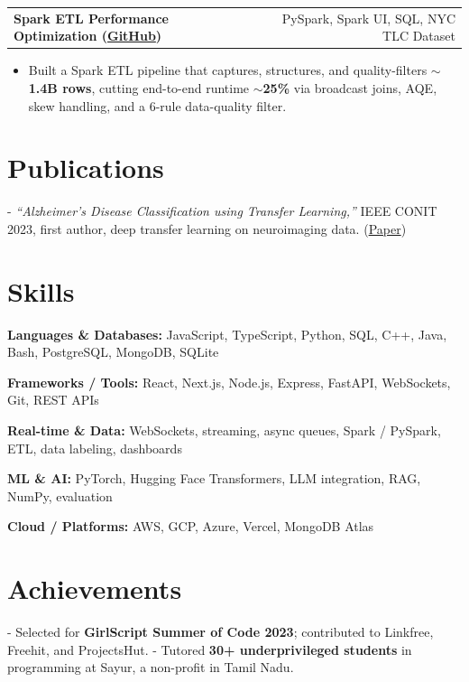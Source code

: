 \documentclass[letterpaper,11pt]{article}
\makeatletter
\newcommand{\projItem}[2]{%
  \vspace{6pt}
  \begin{tabular*}{\textwidth}{@{}l@{\extracolsep{\fill}}r@{}}
    \textbf{#1} & #2 \\
  \end{tabular*}\par\vspace{-2pt}
}
\newcommand{\skillLine}[2]{\textbf{#1:} #2\par\vspace{2pt}}
\newcommand{\inlineBlock}[1]{{\setlength{\leftskip}{0.18in}\small #1\par}}
\makeatother
\begin{document}
\projItem{Spark ETL Performance Optimization {\normalfont\small(\href{https://github.com/Deva-1903/Spark-ETL-Optimization}{GitHub})}}{PySpark, Spark UI, SQL, NYC TLC Dataset}
\begin{itemize}
  \item Built a Spark ETL pipeline that captures, structures, and quality-filters \textbf{$\sim$1.4B rows}, cutting end-to-end runtime \textbf{$\sim$25\%} via broadcast joins, AQE, skew handling, and a 6-rule data-quality filter.
\end{itemize}

\section{Publications}
\inlineBlock{- \textit{``Alzheimer's Disease Classification using Transfer Learning,''} IEEE CONIT 2023, first author, deep transfer learning on neuroimaging data. {\normalfont\small(\href{https://ieeexplore.ieee.org/document/10205760}{Paper})}}

\section{Skills}
\skillLine{Languages \& Databases}{JavaScript, TypeScript, Python, SQL, C++, Java, Bash, PostgreSQL, MongoDB, SQLite}
\skillLine{Frameworks / Tools}{React, Next.js, Node.js, Express, FastAPI, WebSockets, Git, REST APIs}
\skillLine{Real-time \& Data}{WebSockets, streaming, async queues, Spark / PySpark, ETL, data labeling, dashboards}
\skillLine{ML \& AI}{PyTorch, Hugging Face Transformers, LLM integration, RAG, NumPy, evaluation}
\skillLine{Cloud / Platforms}{AWS, GCP, Azure, Vercel, MongoDB Atlas}

\section{Achievements}
\inlineBlock{- Selected for \textbf{GirlScript Summer of Code 2023}; contributed to Linkfree, Freehit, and ProjectsHut. - Tutored \textbf{30+ underprivileged students} in programming at Sayur, a non-profit in Tamil Nadu.}
\end{document}
